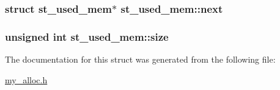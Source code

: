 \subsubsection[{next}]{\setlength{\rightskip}{0pt plus 5cm}struct {\bf st\+\_\+used\+\_\+mem}$\ast$ st\+\_\+used\+\_\+mem\+::next}\label{structst__used__mem_af0d44c8373329563afc30a14acc810b4}
\hypertarget{structst__used__mem_ab8fe1a337ad5024c34bd7b26400ce96e}{}
\subsubsection[{size}]{\setlength{\rightskip}{0pt plus 5cm}unsigned int st\+\_\+used\+\_\+mem\+::size}\label{structst__used__mem_ab8fe1a337ad5024c34bd7b26400ce96e}


The documentation for this struct was generated from the following file\+:\begin{DoxyCompactItemize}
\item 
\hyperlink{my__alloc_8h}{my\+\_\+alloc.\+h}\end{DoxyCompactItemize}
